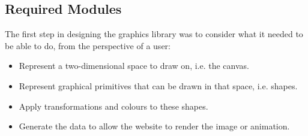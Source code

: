 \documentclass[../main.tex]{subfiles}
\begin{document}
        \subsection{Required Modules}
            The first step in designing the graphics library was to consider what it needed
            to be able to do, from the perspective of a user:
            \begin{itemize}
                \item Represent a two-dimensional space to draw on, i.e. the canvas.
                \item Represent graphical primitives that can be drawn in that space, i.e.
                      shapes.
                \item Apply transformations and colours to these shapes.
                \item Generate the data to allow the website to render the image or animation.
            \end{itemize}
\end{document}
